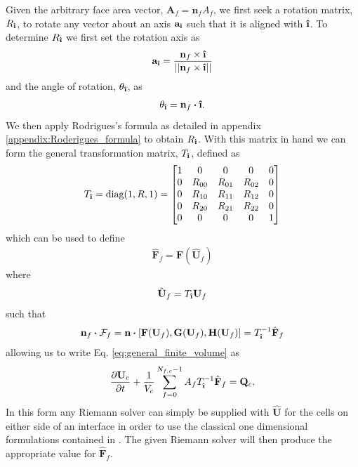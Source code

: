\documentclass[10pt,letterpaper,notitlepage]{article}
\numberwithin{equation}{section}
\newcommand{\partialderiv}[2]{\frac{\partial #1}{\partial #2}}
\newcommand{\dotp}{\boldsymbol{\cdot}}
\newcommand{\uvec}[1]{\boldsymbol{\hat{\textbf{#1}}}}
\newcommand{\ihat}{\uvec{\i}}
\newcommand{\hatbf}[1]{\hat{\mathbf{#1}}}
\newcommand{\beqn}{\begin{equation}\begin{aligned}}
\newcommand{\eeqn}{\end{aligned}\end{equation}}
\begin{document}
Given the arbitrary face area vector, $\mathbf{A}_f=\mathbf{n}_f A_f$, we first seek a rotation matrix, $R_{\ihat}$, to rotate any vector about an axis $\mathbf{a}_{\ihat}$ such that it is aligned with $\ihat$. To determine $R_{\ihat}$ we first set the rotation axis as
\beqn 
\mathbf{a}_{\ihat} = \frac{\mathbf{n}_f \times \ihat}{||\mathbf{n}_f \times \ihat||}
\eeqn 
and the angle of rotation, $\theta_{\ihat}$, as
\beqn 
\theta_{\ihat} = \mathbf{n}_f \dotp \ihat.
\eeqn 
We then apply Rodrigues's formula as detailed in appendix \ref{appendix:Roderigues_formula} to obtain $R_{\ihat}$. With this matrix in hand we can form the general transformation matrix, $T_{\ihat}$, defined as
\beqn
T_{\ihat} = \text{diag}(1,R,1) = 
\begin{bmatrix}
1 & 0         & 0         & 0         & 0 \\
0 & R_{00} & R_{01} & R_{02} & 0 \\
0 & R_{10} & R_{11} & R_{12} & 0 \\
0 & R_{20} & R_{21} & R_{22} & 0 \\
0 & 0         & 0         & 0         & 1 \\
\end{bmatrix}
\eeqn
which can be used to define 
\beqn 
\hatbf{F}_f = \mathbf{F}(\hatbf{U}_f)
\eeqn 
where
\beqn 
\hatbf{U}_f = T_{\ihat} \mathbf{U}_f
\eeqn 
such that
\beqn 
\mathbf{n}_f \dotp \mathcal{F}_f
= \mathbf{n} \dotp [
\mathbf{F}(\mathbf{U}_f),
\mathbf{G}(\mathbf{U}_f),
\mathbf{H}(\mathbf{U}_f)]
=
T_{\ihat}^{-1} \hatbf{F}_f
\eeqn 
allowing us to write Eq. \eqref{eq:general_finite_volume} as 
\beqn 
\partialderiv{\mathbf{U}_c}{t} 
+ 
\frac{1}{V_c}
\sum_{f=0}^{N_{f,c}{-}1} 
A_f  T_{\ihat}^{-1} \hatbf{F}_f
=  \mathbf{Q}_c.
\eeqn 
In this form any Riemann solver can simply be supplied with $\hat{\mathbf{U}}$ for the cells on either side of an interface in order to use the classical one dimensional formulations contained in \cite{Toro}. The given Riemann solver will then produce the appropriate value for $\hatbf{F}_f$.
\end{document}
